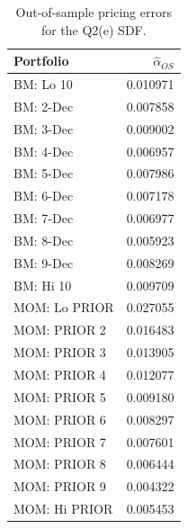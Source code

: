 \begin{table}[htbp]
\centering
\caption{Out-of-sample pricing errors for the Q2(e) SDF.}
\label{tab:q2e-pricing-errors}
\begin{tabular}{lr}
\hline
Portfolio & $\widehat{\alpha}_{OS}$ \\
\hline
BM: Lo 10 & 0.010971 \\
BM: 2-Dec & 0.007858 \\
BM: 3-Dec & 0.009002 \\
BM: 4-Dec & 0.006957 \\
BM: 5-Dec & 0.007986 \\
BM: 6-Dec & 0.007178 \\
BM: 7-Dec & 0.006977 \\
BM: 8-Dec & 0.005923 \\
BM: 9-Dec & 0.008269 \\
BM: Hi 10 & 0.009709 \\
MOM: Lo PRIOR & 0.027055 \\
MOM: PRIOR 2 & 0.016483 \\
MOM: PRIOR 3 & 0.013905 \\
MOM: PRIOR 4 & 0.012077 \\
MOM: PRIOR 5 & 0.009180 \\
MOM: PRIOR 6 & 0.008297 \\
MOM: PRIOR 7 & 0.007601 \\
MOM: PRIOR 8 & 0.006444 \\
MOM: PRIOR 9 & 0.004322 \\
MOM: Hi PRIOR & 0.005453 \\
\hline
\end{tabular}
\end{table}
